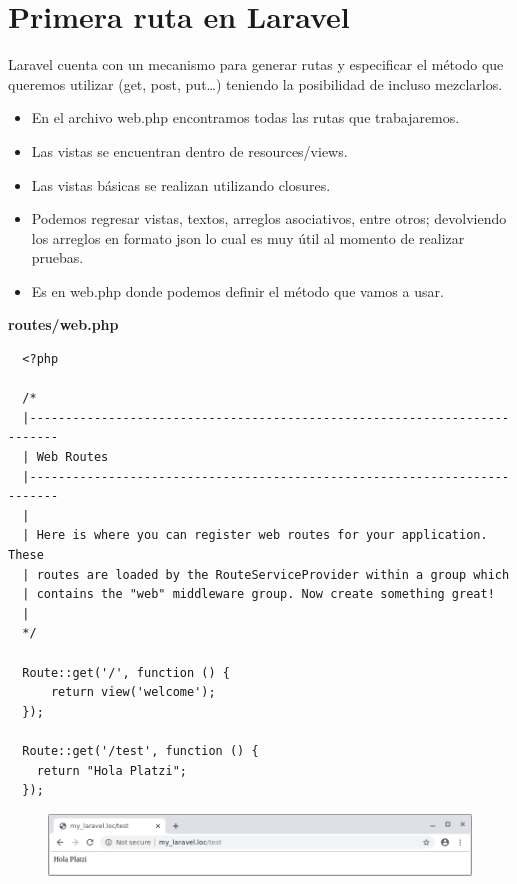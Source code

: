 \documentclass{article}
\begin{document}
\section{Primera ruta en Laravel}%
Laravel cuenta con un mecanismo para generar rutas y especificar el método que
queremos utilizar (get, post, put…) teniendo la posibilidad de incluso
mezclarlos.\\

\begin{itemize}
  \item En el archivo web.php encontramos todas las rutas que trabajaremos.
  \item Las vistas se encuentran dentro de resources/views.
  \item Las vistas básicas se realizan utilizando closures.
  \item Podemos regresar vistas, textos, arreglos asociativos, entre otros;
    devolviendo los arreglos en formato json lo cual es muy útil al momento de
    realizar pruebas.
  \item Es en web.php donde podemos definir el método que vamos a usar.
\end{itemize}


\textbf{routes/web.php}
\begin{verbatim}
  <?php

  /*
  |--------------------------------------------------------------------------
  | Web Routes
  |--------------------------------------------------------------------------
  |
  | Here is where you can register web routes for your application. These
  | routes are loaded by the RouteServiceProvider within a group which
  | contains the "web" middleware group. Now create something great!
  |
  */

  Route::get('/', function () {
      return view('welcome');
  });

  Route::get('/test', function () {
    return "Hola Platzi";
  });
\end{verbatim}


\begin{figure}[h!]
  \centering
  \includegraphics[scale=0.5]{./Pictures/004_test.png}
\end{figure}

\newpage
\end{document}
